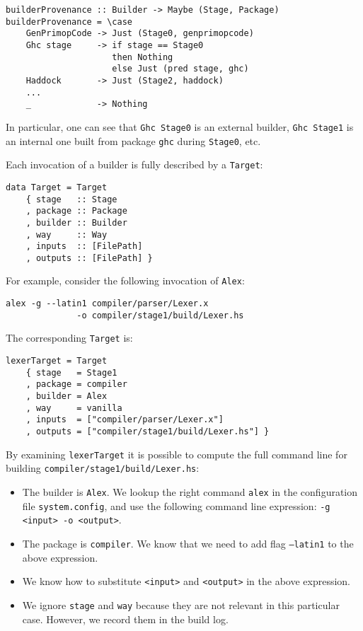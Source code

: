 \begin{lstlisting}[basicstyle=\ttfamily]
builderProvenance :: Builder -> Maybe (Stage, Package)
builderProvenance = \case
    GenPrimopCode -> Just (Stage0, genprimopcode)
    Ghc stage     -> if stage == Stage0
                     then Nothing
                     else Just (pred stage, ghc)
    Haddock       -> Just (Stage2, haddock)
    ...
    _             -> Nothing
\end{lstlisting}

In particular, one can see that \texttt{Ghc Stage0} is an external builder,
\texttt{Ghc Stage1} is an internal one built from package \texttt{ghc}
during \texttt{Stage0}, etc.

Each invocation of a builder is fully described by a \texttt{Target}:

\begin{lstlisting}[basicstyle=\ttfamily]
data Target = Target
    { stage   :: Stage
    , package :: Package
    , builder :: Builder
    , way     :: Way
    , inputs  :: [FilePath]
    , outputs :: [FilePath] }
\end{lstlisting}

\noindent For example, consider the following invocation of \texttt{Alex}:

\begin{verbatim}
alex -g --latin1 compiler/parser/Lexer.x
              -o compiler/stage1/build/Lexer.hs
\end{verbatim}

\noindent The corresponding \texttt{Target} is:

\begin{lstlisting}[basicstyle=\ttfamily]
lexerTarget = Target
    { stage   = Stage1
    , package = compiler
    , builder = Alex
    , way     = vanilla
    , inputs  = ["compiler/parser/Lexer.x"]
    , outputs = ["compiler/stage1/build/Lexer.hs"] }
\end{lstlisting}

By examining \texttt{lexerTarget} it is possible to compute the full command
line for building \texttt{compiler/stage1/build/Lexer.hs}:
\begin{itemize}
  \item The builder is \texttt{Alex}. We lookup the right command
  \texttt{alex} in the configuration file \texttt{system.config}, and use the
  following command line expression: \texttt{-g <input> -o <output>}.
  \item The package is \texttt{compiler}. We know that we need to add
  flag \texttt{--latin1} to the above expression.
  \item We know how to substitute \texttt{<input>} and \texttt{<output>} in the
  above expression.
  \item We ignore \texttt{stage} and \texttt{way} because they are not relevant
  in this particular case. However, we record them in the build log.
\end{itemize}

